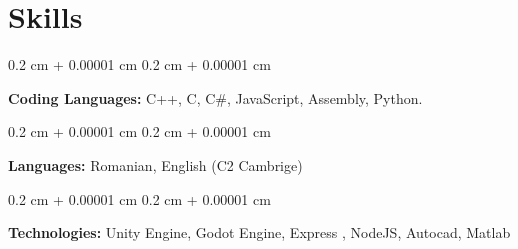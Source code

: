 \documentclass[10pt, letterpaper]{article}
\newenvironment{onecolentry}{
    \begin{adjustwidth}{
        0.2 cm + 0.00001 cm
    }{
        0.2 cm + 0.00001 cm
    }
}{
    \end{adjustwidth}
} %
\begin{document}
    \section{Skills}

        
        \begin{onecolentry}
            \textbf{Coding Languages:} C++, C, C\#, JavaScript, Assembly, Python.
        \end{onecolentry}

        \vspace{0.2 cm}

        \begin{onecolentry}
            \textbf{Languages: }Romanian, English (C2 Cambrige)
        \end{onecolentry}

        \vspace{0.2 cm}

        \begin{onecolentry}
            \textbf{Technologies:} Unity Engine, Godot Engine, Express , NodeJS, Autocad, Matlab
        \end{onecolentry}


    
\end{document}
